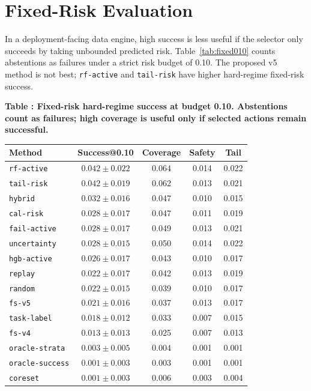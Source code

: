 \documentclass{article}
\begin{document}
\section{Fixed-Risk Evaluation}
In a deployment-facing data engine, high success is less useful if the selector only succeeds by taking unbounded predicted risk. Table~\ref{tab:fixed010} counts abstentions as failures under a strict risk budget of 0.10. The proposed v5 method is not best; \texttt{rf-active} and \texttt{tail-risk} have higher hard-regime fixed-risk success.

\scriptsize
\setlength{\tabcolsep}{2pt}
\begin{center}
\label{tab:fixed010}\textbf{Table \thetable: Fixed-risk hard-regime success at budget 0.10. Abstentions count as failures; high coverage is useful only if selected actions remain successful.}\\[0.4ex]
\begin{tabular}{lcccc}
\toprule
Method & Success@0.10 & Coverage & Safety & Tail \\
\midrule
\texttt{rf-active} & $0.042 \pm 0.022$ & 0.064 & 0.014 & 0.022 \\
\texttt{tail-risk} & $0.042 \pm 0.019$ & 0.062 & 0.013 & 0.021 \\
\texttt{hybrid} & $0.032 \pm 0.016$ & 0.047 & 0.010 & 0.015 \\
\texttt{cal-risk} & $0.028 \pm 0.017$ & 0.047 & 0.011 & 0.019 \\
\texttt{fail-active} & $0.028 \pm 0.017$ & 0.049 & 0.013 & 0.021 \\
\texttt{uncertainty} & $0.028 \pm 0.015$ & 0.050 & 0.014 & 0.022 \\
\texttt{hgb-active} & $0.026 \pm 0.017$ & 0.043 & 0.010 & 0.017 \\
\texttt{replay} & $0.022 \pm 0.017$ & 0.042 & 0.013 & 0.019 \\
\texttt{random} & $0.022 \pm 0.015$ & 0.039 & 0.010 & 0.017 \\
\texttt{fs-v5} & $0.021 \pm 0.016$ & 0.037 & 0.013 & 0.017 \\
\texttt{task-label} & $0.018 \pm 0.012$ & 0.033 & 0.007 & 0.015 \\
\texttt{fs-v4} & $0.013 \pm 0.013$ & 0.025 & 0.007 & 0.013 \\
\texttt{oracle-strata} & $0.003 \pm 0.005$ & 0.004 & 0.001 & 0.001 \\
\texttt{oracle-success} & $0.001 \pm 0.003$ & 0.003 & 0.001 & 0.001 \\
\texttt{coreset} & $0.001 \pm 0.003$ & 0.006 & 0.003 & 0.004 \\
\bottomrule
\end{tabular}
\end{center}
\normalsize
\end{document}
